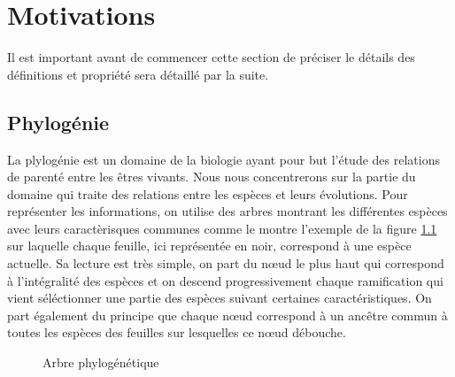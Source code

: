 \chapter{Motivations}

Il est important avant de commencer cette section de préciser le détails des définitions et propriété sera détaillé par la suite.

\section{Phylogénie}

La plylogénie est un domaine de la biologie ayant pour but l'étude des relations de parenté entre les êtres vivants. Nous nous concentrerons sur la partie du domaine qui traite des relations entre les espèces et leurs évolutions. Pour représenter les informations, on utilise des arbres montrant les différentes espèces avec leurs caractèrisques communes comme le montre l'exemple de la figure \ref{arbre_phylogenie} sur laquelle chaque feuille, ici représentée en noir, correspond à une espèce actuelle. Sa lecture est très simple, on part du n\oe ud le plus haut qui correspond à l'intégralité des espèces et on descend progressivement chaque ramification qui vient séléctionner une partie des espèces suivant certaines caractéristiques. On part également du principe que chaque n\oe ud correspond à un ancêtre commun à toutes les espèces des feuilles sur lesquelles ce n\oe ud débouche.

\begin{figure}[H]
	\begin{center}
	\end{center}
	\caption{Arbre phylogénétique}
	\label{arbre_phylogenie}
\end{figure}

